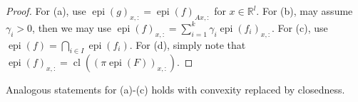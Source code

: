 \begin{proof}
	For (a), use $\operatorname{epi}(g)_{x,:}=\operatorname{epi}(f)_{Ax,:}$ for $x\in \mathbb{R}^l$. For (b), may assume $ \gamma_i>0$, then we may use $\operatorname{epi}(f)_{x,:}=\sum_{i=1}^k\gamma_i\operatorname{epi}(f_i)_{x,:}$.	For (c), use $\operatorname{epi}(f)=\bigcap_{i\in I}\operatorname{epi}(f_i)$. For (d), simply note that $\operatorname{epi}(f)_{x,:}=\operatorname{cl}((\pi\operatorname{epi}(F))_{x,:})$.
\end{proof}

\begin{rmrk}
	Analogous statements for (a)-(c) holds with convexity replaced by closedness.
\end{rmrk}

